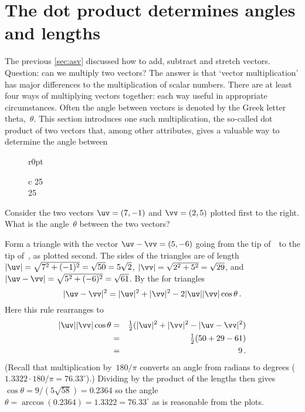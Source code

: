 
\section{The dot product determines angles and lengths}
\label{sec:dpdal}
\secttoc


The previous \cref{sec:asv} discussed how to add, subtract and stretch vectors.
Question: can we multiply two vectors?
The answer is that `vector multiplication' has major differences to the multiplication of scalar numbers.
There are at least four ways of multiplying vectors together: each way useful in appropriate circumstances.
Often the angle between vectors is denoted by the Greek letter theta,~\(\theta\).
This section introduces one such multiplication, the so-called dot product of two vectors that, among other attributes, gives a valuable way to determine the angle between 

{%
\def\vecopsHook{\node[above] at (axis cs:0,0) {$\qquad\theta$};}
\begin{wrapfigure}r{0pt}\begin{tabular}c
25\\25
\end{tabular}\end{wrapfigure}
\begin{example} \label{eg:ezyang}
Consider the two vectors \(\uv=(7,-1)\) and \(\vv=(2,5)\) plotted first to the right.
What is the angle~\(\theta\) between the two vectors?
\begin{solution} 
Form a triangle with the vector \(\uv-\vv=(5,-6)\) going from the tip of~\vv\ to the tip of~\uv, as plotted second.
The sides of the triangles are of length \(|\uv|=\sqrt{7^2+(-1)^2}=\sqrt{50}=5\sqrt2\), \(|\vv|=\sqrt{2^2+5^2}=\sqrt{29}\), and \(|\uv-\vv|=\sqrt{5^2+(-6)^2}=\sqrt{61}\).
By the  for triangles
\begin{equation*}
|\uv-\vv|^2=|\uv|^2+|\vv|^2-2|\uv||\vv|\cos\theta \,.
\end{equation*}
Here this rule rearranges to
\begin{eqnarray*}
|\uv||\vv|\cos\theta
&=&\tfrac12(|\uv|^2+|\vv|^2-|\uv-\vv|^2)
\\&=&\tfrac12(50+29-61)
\\&=&9\,.
\end{eqnarray*}
(Recall that multiplication by~\(180/\pi\) converts an angle from radians to degrees (\(1.3322\cdot180/\pi=76.33^\circ\)).)
Dividing by the product of the lengths then gives \(\cos\theta=9/(5\sqrt{58})=0.2364\) 
so the angle \(\theta =\arccos(0.2364) =1.3322 =76.33^\circ\) as is reasonable from the plots.
\end{solution}
\end{example}
}%

